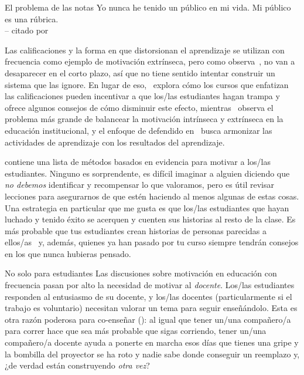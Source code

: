 \begin{aside}{El problema de las notas}
  Yo nunca he tenido un público en mi vida. Mi público es una rúbrica.\\
  -- citado por 

 Las calificaciones y la forma en que distorsionan el aprendizaje se utilizan con frecuencia como ejemplo de motivación extrínseca,
  pero como observa~\cite{Mill2016a},
  no van a desaparecer en el corto plazo,
  así que no tiene sentido intentar construir un sistema que las ignore.
  En lugar de eso,~\cite{Lang2013} explora cómo los cursos que enfatizan las calificaciones
  pueden incentivar a que los/las estudiantes hagan trampa
  y ofrece algunos consejos de cómo disminuir este efecto,
  mientras~\cite{Covi2017} observa el problema más grande de
  balancear la motivación intrínseca y extrínseca en la educación institucional,
  y el enfoque de 
  defendido en~\cite{Bigg2011} busca armonizar las actividades de aprendizaje con los resultados del aprendizaje.
\end{aside}

\cite{Ambr2010} contiene una lista de métodos basados en evidencia para motivar a los/las estudiantes.
Ninguno es sorprendente, es
difícil imaginar a alguien diciendo que \emph{no debemos} identificar y recompensar lo que valoramos, pero
es útil revisar lecciones para asegurarnos de que estén haciendo al menos algunas de estas cosas.
Una estrategia en particular que me gusta es
que los/las estudiantes que hayan luchado y tenido éxito
se acerquen y cuenten sus historias al resto de la clase.
Es más probable que tus estudiantes crean historias de personas parecidas a ellos/as~\cite{Mill2016a}
y, además, quienes ya han pasado por tu curso
siempre tendrán consejos en los que nunca hubieras pensado.

\begin{aside}{No solo para estudiantes}
  Las discusiones sobre motivación en educación con frecuencia pasan por alto la necesidad de motivar al \emph{docente}.
  Los/las estudiantes responden al entusiasmo de su docente,
  y los/las docentes (particularmente si el trabajo es voluntario) necesitan valorar un tema para seguir enseñándolo. 
  Esta es otra razón poderosa para co-enseñar ():
  al igual que tener un/una compañero/a para correr hace que sea más probable que sigas corriendo,
  tener un/una compañero/a docente ayuda a ponerte en marcha
  esos días que tienes una gripe
  y la bombilla del proyector se ha roto
  y nadie sabe donde conseguir un reemplazo
  y, ¿de verdad están construyendo \emph{otra vez}?
\end{aside}

